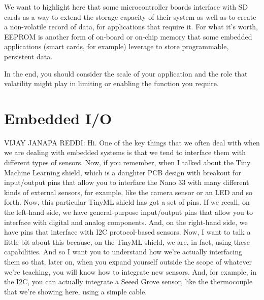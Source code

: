 We want to highlight here that some microcontroller boards interface with SD cards as a way to extend the storage capacity of their system as well as to create a non-volatile record of data, for applications that require it. For what it’s worth, EEPROM is another form of on-board or on-chip memory that some embedded applications (smart cards, for example) leverage to store programmable, persistent data.

In the end, you should consider the scale of your application and the role that volatility might play in limiting or enabling the function you require.

\section{Embedded I/O}


VIJAY JANAPA REDDI: Hi.
One of the key things that we often deal with when we are dealing with embedded systems is that we tend to interface them with different types of sensors.
Now, if you remember, when I talked about the Tiny Machine Learning shield, which is a daughter PCB design with breakout for input/output pins that allow you to interface the Nano 33 with many different kinds of external sensors, for example, like the camera sensor or an LED and so forth.
Now, this particular TinyML shield has got a set of pins.
If we recall, on the left-hand side, we have general-purpose input/output pins that allow you to interface with digital and analog components.
And, on the right-hand side, we have pins that interface with I2C protocol-based sensors.
Now, I want to talk a little bit about this because, on the TinyML shield, we are, in fact, using these capabilities.
And so I want you to understand how we're actually interfacing them so that, later on, when you expand yourself outside the scope of whatever we're teaching, you will know how to integrate new sensors.
And, for example, in the I2C, you can actually integrate a Seeed Grove sensor, like the thermocouple that we're showing here, using a simple cable.


